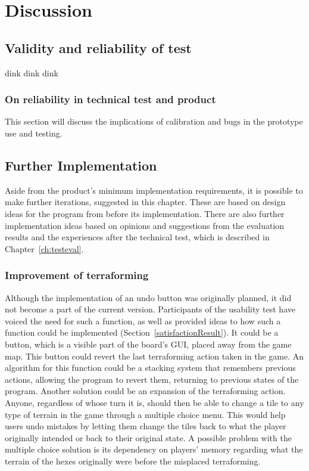 \chapter{Discussion}\label{ch:discussion}

\section{Validity and reliability of test}
dink dink dink

\subsection{On reliability in technical test and product}
This section will discuss the implications of calibration and bugs in the prototype use and testing.



\section{Further Implementation}
Aside from the product's minimum implementation requirements, it is possible to make further iterations, suggested in this chapter. These are based on design ideas for the program from before its implementation. There are also further implementation ideas based on opinions and suggestions from the evaluation results and the experiences after the technical test, which is described in Chapter~\ref{ch:testeval}.

\subsection{Improvement of terraforming}
Although the implementation of an undo button was originally planned, it did not become a part of the current version. Participants of the usability test have voiced the need for such a function, as well as provided ideas to how such a function could be implemented (Section~\ref{satisfactionResult}). It could be a button, which is a visible part of the board's GUI, placed away from the game map. This button could revert the last terraforming action taken in the game. An algorithm for this function could be a stacking system that remembers previous actions, allowing the program to revert them, returning to previous states of the program. Another solution could be an expansion of the terraforming action. Anyone, regardless of whose turn it is, should then be able to change a tile to any type of terrain in the game through a multiple choice menu. This would help users undo mistakes by letting them change the tiles back to what the player originally intended or back to their original state. A possible problem with the multiple choice solution is its dependency on players' memory regarding what the terrain of the hexes originally were before the misplaced terraforming. 

